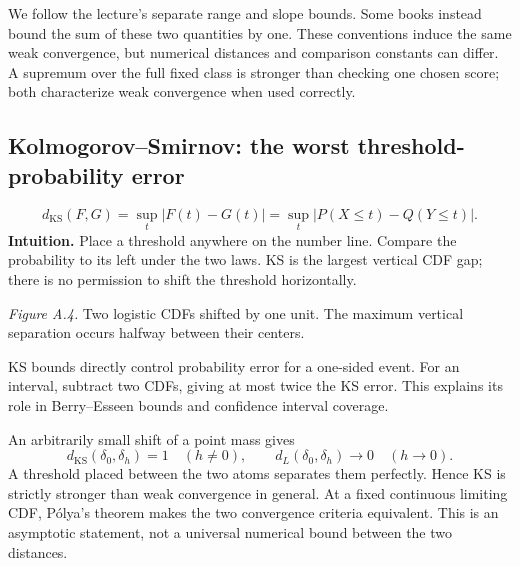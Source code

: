 \documentclass[12pt]{article}
\begin{document}
\begin{remarkbox}
We follow the lecture's separate range and slope bounds. Some books instead
bound the sum of these two quantities by one. These conventions induce the
same weak convergence, but numerical distances and comparison constants
can differ. A supremum over the full fixed class is stronger than checking
one chosen score; both characterize weak convergence when used correctly.
\end{remarkbox}

\clearpage
\subsection{Kolmogorov--Smirnov: the worst threshold-probability error}
\begin{equation}
 d_{\mathrm{KS}}(F,G)=\sup_t|F(t)-G(t)|
 =\sup_t|P(X\le t)-Q(Y\le t)|.
\end{equation}
\textbf{Intuition.} Place a threshold anywhere on the number line. Compare
the probability to its left under the two laws. KS is the largest vertical
CDF gap; there is no permission to shift the threshold horizontally.

\begin{center}
\end{center}
\textit{Figure A.4.} Two logistic CDFs shifted by one unit. The maximum
vertical separation occurs halfway between their centers.

KS bounds directly control probability error for a one-sided event. For an
interval, subtract two CDFs, giving at most twice the KS error. This explains
its role in Berry--Esseen bounds and confidence interval coverage.

An arbitrarily small shift of a point mass gives
\begin{equation}
 d_{\mathrm{KS}}(\delta_0,\delta_h)=1\quad(h\ne0),
 \qquad d_L(\delta_0,\delta_h)\to0\quad(h\to0).
\end{equation}
A threshold placed between the two atoms separates them perfectly. Hence
KS is strictly stronger than weak convergence in general. At a fixed
continuous limiting CDF, P\'olya's theorem makes the two convergence criteria
equivalent. This is an asymptotic statement, not a universal numerical bound
between the two distances.
\end{document}
